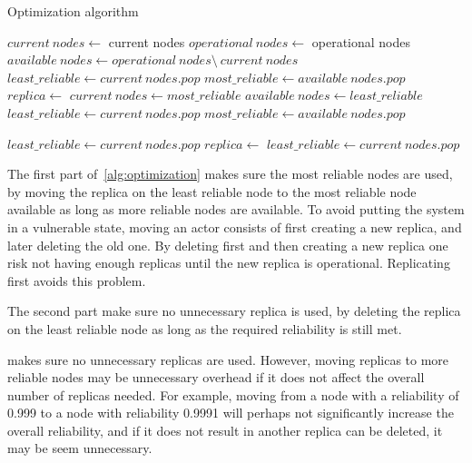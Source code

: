 \documentclass{cslthse-msc}
\begin{document}
\begin{algorithm} 
	\caption{Optimization algorithm} \label{alg:optimization}
	\begin{algorithmic}[1]
	\State $current\ nodes\gets $ current nodes
	\State $operational\ nodes\gets $ operational nodes
	\State $available\ nodes\gets operational\ nodes \setminus \ current\ nodes$
	\State
	\State
	\State $least\_reliable\gets current\ nodes.pop$
	\State $most\_reliable\gets available\ nodes.pop$
			\State $replica\gets $
			\State
			\State
			\State
			\State $current\ nodes\gets most\_reliable$
			\State $available\ nodes\gets least\_reliable$
			\State $least\_reliable\gets current\ nodes.pop$
			\State $most\_reliable\gets available\ nodes.pop$
	\EndWhile
	\EndProcedure
	\State
	
	\State $least\_reliable\gets current\ nodes.pop$
		\State $replica\gets $
		\State
		\State $least\_reliable\gets current\ nodes.pop$
	\EndWhile
	\EndProcedure
	\end{algorithmic}
\end{algorithm}

The first part of~\cref{alg:optimization} makes sure the most reliable nodes are used, by moving the replica on the least reliable node to the most reliable node available as long as more reliable nodes are available. To avoid putting the system in a vulnerable state, moving an actor consists of first creating a new replica, and later deleting the old one. By deleting first and then creating a new replica one risk not having enough replicas until the new replica is operational. Replicating first avoids this problem.

The second part make sure no unnecessary replica is used, by deleting the replica on the least reliable node as long as the required reliability is still met.

 makes sure no unnecessary replicas are used. However, moving replicas to more reliable nodes may be unnecessary overhead if it does not affect the overall number of replicas needed. For example, moving from a node with a reliability of 0.999 to a node with reliability 0.9991 will perhaps not significantly increase the overall reliability, and if it does not result in another replica can be deleted, it may be seem unnecessary.
\end{document}
